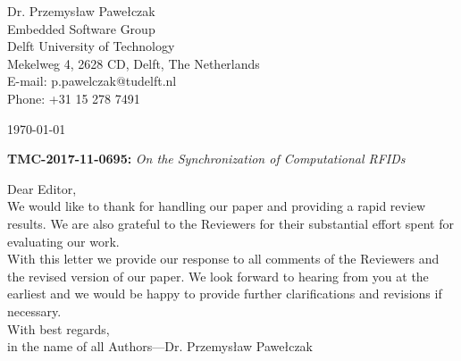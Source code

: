 \documentclass[10pt]{article}
\begin{document}
\pagestyle{myheadings}
\thispagestyle{empty}


\headsep 0.5cm

\bigskip\bigskip


\bigskip\bigskip

\begin{flushright}
Dr. Przemys{\l}aw Pawe{\l}czak \\
Embedded Software Group \\ 
Delft University of Technology \\ 
Mekelweg 4, 2628 CD, Delft, The Netherlands \\
E-mail: p.pawelczak@tudelft.nl\\
Phone: +31 15 278 7491\\
\end{flushright}

\vspace*{2cm}

\today
\medskip


\textbf{TMC-2017-11-0695:} {\sl On the Synchronization of Computational RFIDs}

\bigskip

Dear Editor,\\

We would like to thank for handling our paper and providing a rapid review results. We are also grateful to the Reviewers for their substantial effort spent for evaluating our work. \\

With this letter we provide our response to all comments of the Reviewers and the revised version of our paper. We look forward to hearing from you at the earliest and we would be happy to provide further clarifications and revisions if necessary. \\

With best regards, \\

in the name of all Authors---Dr. Przemys{\l}aw Pawe{\l}czak

\pagebreak
\end{document}
